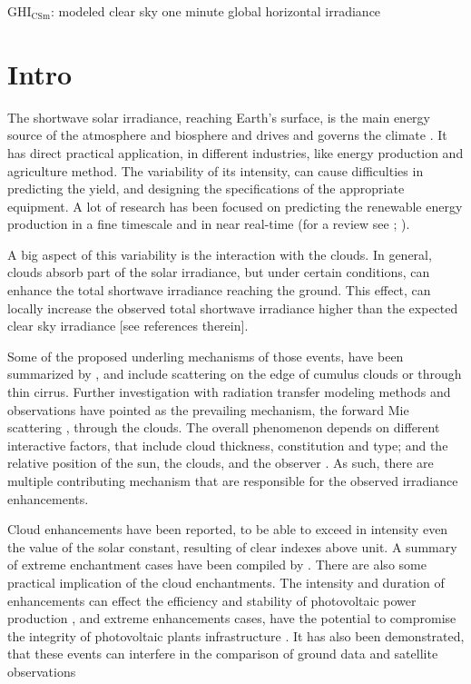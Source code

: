 \documentclass[preprint, 3p,
authoryear]{elsarticle} %
\begin{document}
\(\text{GHI}_\text{CSm}\): modeled clear sky one minute global
horizontal irradiance

\hypertarget{intro}{%
\section{Intro}\label{intro}}

The shortwave solar irradiance, reaching Earth's surface, is the main
energy source of the atmosphere and biosphere and drives and governs the
climate \citep{Gray2010}. It has direct practical application, in
different industries, like energy production and agriculture method. The
variability of its intensity, can cause difficulties in predicting the
yield, and designing the specifications of the appropriate equipment. A
lot of research has been focused on predicting the renewable energy
production in a fine timescale and in near real-time (for a review see
\citet{Inman2013}; \citet{Graabak2016}).

A big aspect of this variability is the interaction with the clouds. In
general, clouds absorb part of the solar irradiance, but under certain
conditions, can enhance the total shortwave irradiance reaching the
ground. This effect, can locally increase the observed total shortwave
irradiance higher than the expected clear sky irradiance {[}see
references therein{]}.

Some of the proposed underling mechanisms of those events, have been
summarized by \citet{Gueymard2017}, and include scattering on the edge
of cumulus clouds or through thin cirrus. Further investigation with
radiation transfer modeling methods and observations have pointed as the
prevailing mechanism, the forward Mie scattering
\citep{Pecenak2016, Thuillier2013, Yordanov2013, Yordanov2015}, through
the clouds. The overall phenomenon depends on different interactive
factors, that include cloud thickness, constitution and type; and the
relative position of the sun, the clouds, and the observer
\citep{Gueymard2017, Veerman2022}. As such, there are multiple
contributing mechanism that are responsible for the observed irradiance
enhancements.

Cloud enhancements have been reported, to be able to exceed in intensity
even the value of the solar constant, resulting of clear indexes above
unit. A summary of extreme enchantment cases have been compiled by
\citet{Martins2022}. There are also some practical implication of the
cloud enchantments. The intensity and duration of enhancements can
effect the efficiency and stability of photovoltaic power production
\citep{Lappalainen2020, Jaervelae2020}, and extreme enhancements cases,
have the potential to compromise the integrity of photovoltaic plants
infrastructure \citep{DoNascimento2019}. It has also been demonstrated,
that these events can interfere in the comparison of ground data and
satellite observations \citep{Damiani2018}
\end{document}
